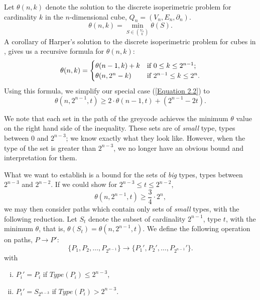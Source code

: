 \documentclass[12pt]{ucthesis}
\theoremstyle{plain}
\theoremstyle{definition}
\begin{document}
Let $\theta(n, k)$ denote the solution to the discrete isoperimetric problem
for cardinality $k$ in the $n$-dimensional cube, $Q_n = (V_n, E_n, \partial_n)$.
\begin{equation*}
\theta(n, k) = \min_{S \in \binom{V_n}{k}} \theta(S).
\end{equation*}
A corollary of Harper's solution to the discrete isoperimetric problem for cubes in \cite{Harper.1964},
gives us a recursive formula for $\theta(n, k)$:
\begin{equation*}
\theta(n, k) = \begin{cases}
	\theta(n - 1, k) + k & \textnormal{if } 0 \le k \le 2^{n - 1}; \\
	\theta(n, 2^n - k) &  \textnormal{if } 2^{n - 1} \le k \le 2^n.
\end{cases}
\end{equation*}
Using this formula, we simplify our special case (\ref{Equation 2.2}) to
\begin{equation*}
\theta(n, 2^{n - 1}, t) \ge 2 \cdot \theta(n - 1, t) + (2^{n - 1} - 2 t).
\end{equation*}

We note that each set in the path of the greycode achieves the minimum $\theta$ value
on the right hand side of the inequality.
These sets are of \emph{small} type, types between $0$ and $2^{n - 3}$;
we know exactly what they look like.
However, when the type of the set is greater than $2^{n - 3}$,
we no longer have an obvious bound and interpretation for them.

What we want to establish is a bound for the sets of \emph{big} types,
types between $2^{n - 3}$ and $2^{n - 2}$.
If we could show for $2^{n - 3} \le t \le 2^{n - 2}$,
\begin{equation}
\label{Equation 2.3}
\theta(n, 2^{n - 1}, t) \ge \frac{3}{4} \cdot 2^n,
\end{equation}
we may then consider paths which contain only sets of \emph{small} types,
with the following reduction.
Let $S_t$ denote the subset of cardinality $2^{n - 1}$, type $t$,
with the minimum $\theta$, that is, $\theta(S_t) = \theta(n, 2^{n - 1}, t)$.
We define the following operation on paths, $P \rightarrow P'$:
\begin{equation*}
\{P_1, P_2, \dots, P_{2^{n - 1}}\} \rightarrow \{P_1', P_2', \dots, P_{2^{n - 1}}'\}.
\end{equation*}
with
\begin{enumerate}[(i)]
	\item $P_i' = P_i$ if $Type(P_i) \le 2^{n - 3}$,
	\item $P_i' = S_{2^{n - 3}}$ if $Type(P_i) > 2^{n - 3}$.
\end{enumerate}
\end{document}
